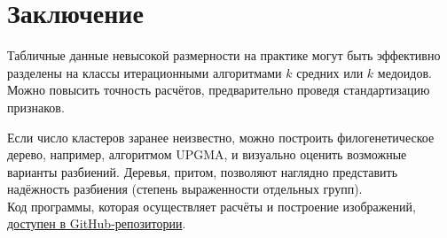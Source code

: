 \documentclass[a4paper,12pt]{article} %
\begin{document}
\newpage
\section{Заключение}

Табличные данные невысокой размерности на практике могут быть эффективно разделены на классы итерационными алгоритмами $ k $ средних или $ k $ медоидов. Можно повысить точность расчётов, предварительно проведя стандартизацию признаков.

Если число кластеров заранее неизвестно, можно построить филогенетическое дерево, например, алгоритмом UPGMA, и визуально оценить возможные варианты разбиений. Деревья, притом, позволяют наглядно представить надёжность разбиения (степень выраженности отдельных групп). \\

Код программы, которая осуществляет расчёты и построение изображений, \href{https://github.com/zuevval/source/tree/master/r/ml/clustering}{доступен в GitHub-репозитории}.


\end{document}
